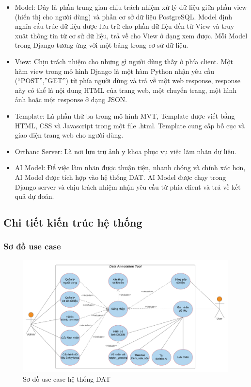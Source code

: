 \begin{itemize}
    \item Model: Đây là phần trung gian chịu trách nhiệm xử lý dữ liệu giữa phần view (hiển thị cho người dùng) và phần cơ sở dữ liệu PostgreSQL. Model định nghĩa cấu trúc dữ liệu được lưu trữ cho phần dữ liệu đến từ View và truy xuât thông tin từ cơ sử dữ liệu, trả về cho View ở dạng xem được. Mỗi Model trong Django tương ứng với một bảng trong cơ sử dữ liệu. 
    \item View: Chịu trách nhiệm cho những gì người dùng thấy ở phía client. Một hàm view trong mô hình Django là một hàm Python nhận yêu cầu (“POST”,”GET”) từ phía người dùng và trả về một web response, response này có thể là nội dung HTML của trang web, một chuyển trang, một hình ảnh hoặc một response ở dạng JSON. 
    \item Template: Là phần thứ ba trong mô hình MVT, Template được viết bằng HTML, CSS và Javascript trong một file .html. Template cung cấp bố cục và giao diện trang web cho người dùng.
    \item Orthanc Server: Là nơi lưu trữ ảnh y khoa phục vụ việc lãm nhãn dữ liệu. 
    \item AI Model: Để việc làm nhãn được thuận tiện, nhanh chóng và chính xác hơn, AI Model được tích hợp vào hệ thống DAT. AI Model được chạy trong Django server và chịu trách nhiệm nhận yêu cầu từ phía client và trả về kết quả dự đoán. 
\end{itemize}

\subsection{Chi tiết kiến trúc hệ thống}
\subsubsection{Sơ đồ use case}
\begin{figure}[H]
    \centering
    \includegraphics[width=14cm]{images/chapter-07-images/use-case-dat.png}
    \caption{Sơ đồ use case hệ thống DAT}
\end{figure}

